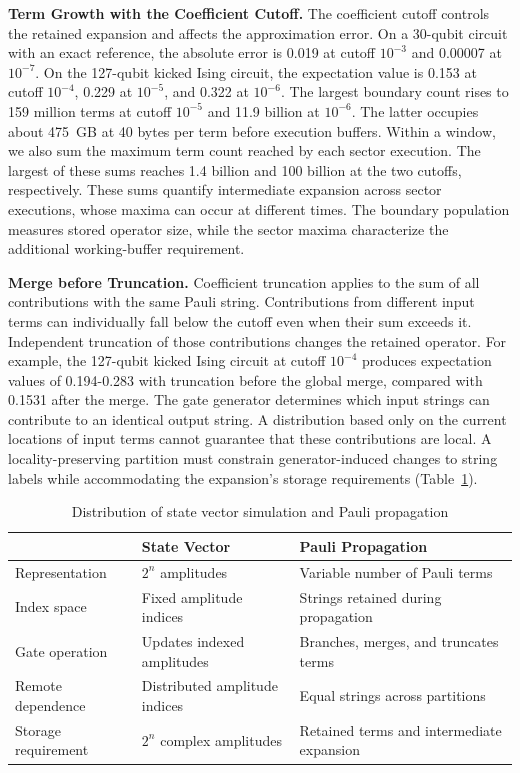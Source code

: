 \noindent\textbf{Term Growth with the Coefficient Cutoff.}
The coefficient cutoff controls the retained expansion and affects the approximation error.
On a 30-qubit circuit with an exact reference, the absolute error is 0.019 at cutoff $10^{-3}$ and 0.00007 at $10^{-7}$.
On the 127-qubit kicked Ising circuit, the expectation value is 0.153 at cutoff $10^{-4}$, 0.229 at $10^{-5}$, and 0.322 at $10^{-6}$.
The largest boundary count rises to 159 million terms at cutoff $10^{-5}$ and 11.9 billion at $10^{-6}$.
The latter occupies about 475~GB at 40 bytes per term before execution buffers.
Within a window, we also sum the maximum term count reached by each sector execution.
The largest of these sums reaches 1.4 billion and 100 billion at the two cutoffs, respectively.
These sums quantify intermediate expansion across sector executions, whose maxima can occur at different times.
The boundary population measures stored operator size, while the sector maxima characterize the additional working-buffer requirement.

\noindent\textbf{Merge before Truncation.}
Coefficient truncation applies to the sum of all contributions with the same Pauli string.
Contributions from different input terms can individually fall below the cutoff even when their sum exceeds it.
Independent truncation of those contributions changes the retained operator.
For example, the 127-qubit kicked Ising circuit at cutoff $10^{-4}$ produces expectation values of 0.194-0.283 with truncation before the global merge, compared with 0.1531 after the merge.
The gate generator determines which input strings can contribute to an identical output string.
A distribution based only on the current locations of input terms cannot guarantee that these contributions are local.
A locality-preserving partition must constrain generator-induced changes to string labels while accommodating the expansion's storage requirements (Table~\ref{tab:sv_pp}).

\begin{table}[t]
\caption{Distribution of state vector simulation and Pauli propagation}
\label{tab:sv_pp}
\centering
\small
\begin{tabular}{@{}lll@{}}
\toprule
 & \textbf{State Vector} & \textbf{Pauli Propagation} \\
\midrule
Representation & $2^n$ amplitudes & Variable number of Pauli terms \\
Index space & Fixed amplitude indices & Strings retained during propagation \\
Gate operation & Updates indexed amplitudes & Branches, merges, and truncates terms \\
Remote dependence & Distributed amplitude indices & Equal strings across partitions \\
Storage requirement & $2^n$ complex amplitudes & Retained terms and intermediate expansion \\
\bottomrule
\end{tabular}
\end{table}

